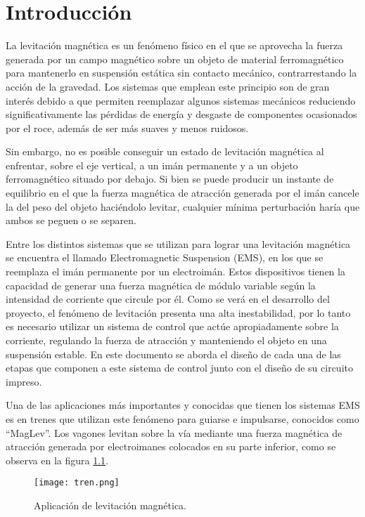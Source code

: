 \chapter{Introducción}  \label{cap:Introducción}

La levitación magnética es un fenómeno físico en el que se aprovecha la fuerza generada por un campo magnético sobre un objeto de material ferromagnético para mantenerlo en suspensión estática sin contacto mecánico, contrarrestando la acción de la gravedad. Los sistemas que emplean este principio son de gran interés debido a que permiten reemplazar algunos sistemas mecánicos reduciendo significativamente las pérdidas de energía y desgaste de componentes ocasionados por el roce, además de ser más suaves y menos ruidosos.

Sin embargo, no es posible conseguir un estado de levitación magnética al enfrentar, sobre el eje vertical, a un imán permanente y a un objeto ferromagnético situado por debajo. Si bien se puede producir un instante de equilibrio en el que la fuerza magnética de atracción generada por el imán cancele la del peso del objeto haciéndolo levitar, cualquier mínima perturbación haría que ambos se peguen o se separen.

Entre los distintos sistemas que se utilizan para lograr una levitación magnética se encuentra el llamado Electromagnetic Suspension (EMS), en los que se reemplaza el imán permanente por un electroimán. Estos dispositivos tienen la capacidad de generar una fuerza magnética de módulo variable según la intensidad de corriente que circule por él. Como se verá en el desarrollo del proyecto, el fenómeno de levitación presenta una alta inestabilidad, por lo tanto es necesario utilizar un sistema de control que actúe apropiadamente sobre la corriente, regulando la fuerza de atracción y manteniendo el objeto en una suspensión estable. En este documento se aborda el diseño de cada una de las etapas que componen a este sistema de control junto con el diseño de su circuito impreso. 

Una de las aplicaciones más importantes y conocidas que tienen los sistemas EMS es en trenes que utilizan este fenómeno para guiarse e impulsarse, conocidos como ``MagLev''. Los vagones levitan sobre la vía mediante una fuerza magnética de atracción generada por electroimanes colocados en su parte inferior, como se  observa en la figura \ref{fig:img_tren}. 


\begin{figure}[H]
	\centering
	\texttt{[image: tren.png]}
	\caption{Aplicación de levitación magnética.}
	\label{fig:img_tren}
\end{figure}

